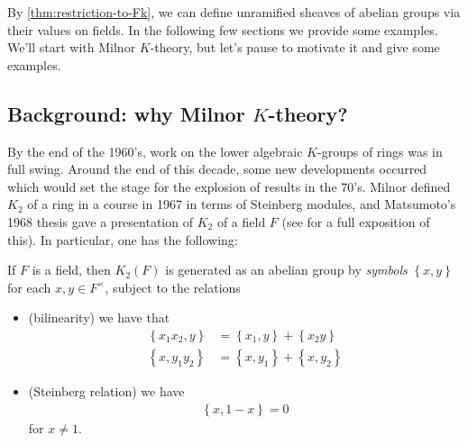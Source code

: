 \documentclass[11pt,openany]{book}
\begin{document}
By \autoref{thm:restriction-to-Fk}, we can define unramified sheaves of abelian groups via their values on fields. In the following few sections we provide some examples. We'll start with Milnor $K$-theory, but let's pause to motivate it and give some examples.

\subsection{Background: why Milnor $K$-theory?}

By the end of the 1960's, work on the lower algebraic $K$-groups of rings was in full swing. Around the end of this decade, some new developments occurred which would set the stage for the explosion of results in the 70's. Milnor defined $K_2$ of a ring in a course in 1967 in terms of Steinberg modules, and Matsumoto's 1968 thesis gave a presentation of $K_2$ of a field $F$ (see  for a full exposition of this). In particular, one has the following:

\begin{theorem} If $F$ is a field, then $K_2(F)$ is generated as an abelian group by \emph{symbols} $\left\{ x,y \right\}$ for each $x,y\in F^\times$, subject to the relations
\begin{itemize}
    \item (bilinearity) we have that
    \begin{align*}
        \left\{ x_1x_2 ,y \right\}&= \left\{ x_1,y \right\} + \left\{ x_2 y \right\} \\
        \left\{ x,y_1y_2 \right\} &= \left\{ x,y_1 \right\} + \left\{ x,y_2 \right\}
    \end{align*}
    \item (Steinberg relation) we have
    \begin{align*}
        \left\{ x,1-x \right\} = 0
    \end{align*}
    for $x\ne 1$.
\end{itemize}
\end{theorem}
\end{document}
